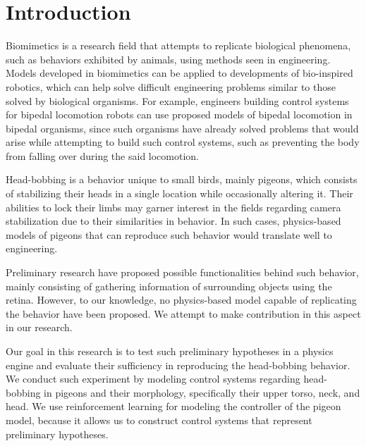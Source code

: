 \chapter{Introduction}
Biomimetics is a research field that attempts to replicate biological phenomena, such as behaviors exhibited by animals, using methods seen in engineering.
Models developed in biomimetics can be applied to developments of bio-inspired robotics, which can help solve difficult engineering problems similar to those solved by biological organisms.
  For example, engineers building control systems for bipedal locomotion robots can use proposed models of bipedal locomotion in bipedal organisms, since such organisms have already solved problems that would arise while attempting to build such control systems, such as preventing the body from falling over during the said locomotion.

Head-bobbing is a behavior unique to small birds, mainly pigeons, which consists of stabilizing their heads in a single location while occasionally altering it.
Their abilities to lock their limbs may garner interest in the fields regarding camera stabilization due to their similarities in behavior.
In such cases, physics-based models of pigeons that can reproduce such behavior would translate well to engineering.

Preliminary research have proposed possible functionalities behind such behavior, mainly consisting of gathering information of surrounding objects using the retina. However, to our knowledge, no physics-based model capable of replicating the behavior have been proposed. We attempt to make contribution in this aspect in our research.

Our goal in this research is to test such preliminary hypotheses in a physics engine and evaluate their sufficiency in reproducing the head-bobbing behavior.
We conduct such experiment by modeling control systems regarding head-bobbing in pigeons and their morphology, specifically their upper torso, neck, and head.
  We use reinforcement learning for modeling the controller of the pigeon model, because it allows us to construct control systems that represent preliminary hypotheses.

